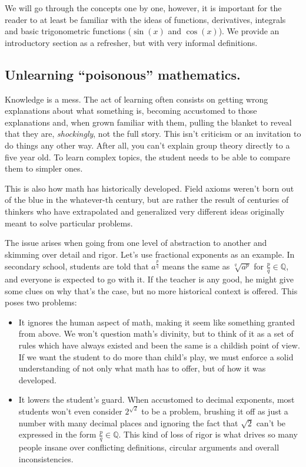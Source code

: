 We will go through the concepts one by one, however, it is important for the reader to at least be familiar with the ideas of functions, derivatives, integrals and basic trigonometric functions ($\sin(x)$ and $\cos(x)$). We provide an introductory section as a refresher, but with very informal definitions.

\subsection{Unlearning \enquote{poisonous} mathematics.}

Knowledge is a mess. The act of learning often consists on getting wrong explanations about what something is, becoming accustomed to those explanations and, when grown familiar with them, pulling the blanket to reveal that they are, \textit{shockingly}, not the full story. This isn't criticism or an invitation to do things any other way. After all, you can't explain group theory directly to a five year old. To learn complex topics, the student needs to be able to compare them to simpler ones.

This is also how math has historically developed. Field axioms weren't born out of the blue in the whatever-th century, but are rather the result of centuries of thinkers who have extrapolated and generalized very different ideas originally meant to solve particular problems.

The issue arises when going from one level of abstraction to another and skimming over detail and rigor. Let's use fractional exponents as an example. In secondary school, students are told that $a^{\frac{p}{q}}$ means the same as $\sqrt[q]{a^p}$ for $\frac{p}{q} \in \mathbb{Q}$, and everyone is expected to go with it. If the teacher is any good, he might give some clues on why that's the case, but no more historical context is offered. This poses two problems:

\begin{itemize}
	\item It ignores the human aspect of math, making it seem like something granted from above. We won't question math's divinity, but to think of it as a set of rules which have always existed and been the same is a childish point of view. If we want the student to do more than child's play, we must enforce a solid understanding of not only what math has to offer, but of how it was developed.
	\item It lowers the student's guard. When accustomed to decimal exponents, most students won't even consider $2^{\sqrt{2}}$ to be a problem, brushing it off as just a number with many decimal places and ignoring the fact that $\sqrt{2}$ can't be expressed in the form $\frac{p}{q} \in \mathbb{Q}$. This kind of loss of rigor is what drives so many people insane over conflicting definitions, circular arguments and overall inconsistencies.
\end{itemize}

